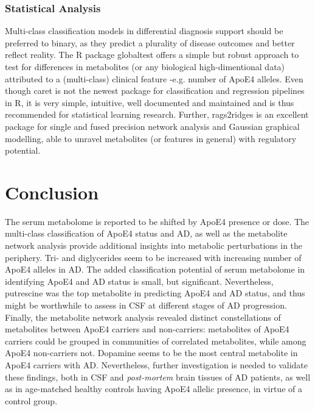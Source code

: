 \documentclass{amsart}
\begin{document}
\subsubsection{Statistical Analysis}Multi-class classification models in differential diagnosis support should be preferred to binary, as they predict a plurality of disease outcomes and better reflect reality. The R package \textsf{globaltest} offers a simple but robust approach to test for differences in metabolites (or any biological high-dimentional data) attributed to a (multi-class) clinical feature -e.g. number of ApoE4 alleles. Even though \textsf{caret} is not the newest package for classification and regression pipelines in R, it is very simple, intuitive, well documented and maintained and is thus recommended for statistical learning research. Further, \textsf{rags2ridges} is an excellent package for single and fused precision network analysis and Gaussian graphical modelling, able to unravel metabolites (or features in general) with regulatory potential.
\clearpage
\section{Conclusion} \label{concl}
The serum metabolome is reported to be shifted by ApoE4 presence or dose. The multi-class classification of ApoE4 status and AD, as well as the metabolite network analysis provide additional insights into metabolic perturbations in the periphery. Tri- and diglycerides seem to be increased with increasing number of ApoE4 alleles in AD. The added classification potential of serum metabolome in identifying ApoE4 and AD status is small, but significant. Nevertheless, putrescine was the top metabolite in predicting ApoE4 and AD status, and thus might be worthwhile to assess in CSF at different stages of AD progression. Finally, the metabolite network analysis revealed distinct constellations of metabolites between ApoE4 carriers and non-carriers: metabolites of ApoE4 carriers could be grouped in communities of correlated metabolites, while among ApoE4 non-carriers not. Dopamine seems to be the most central metabolite in ApoE4 carriers with AD. Nevertheless, further investigation is needed to validate these findings, both in CSF and \textit{post-mortem} brain tissues of AD patients, as well as in age-matched healthy controls having ApoE4 allelic presence, in virtue of a control group. 
\end{document}
